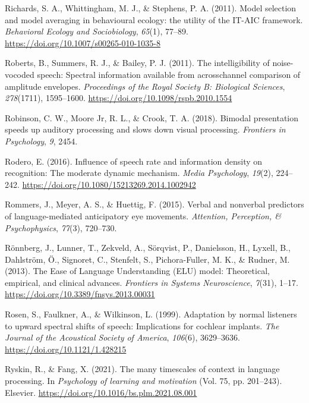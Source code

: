 \documentclass[a4paper, nobind]{templates/ociamthesis}
\newlength{\cslhangindent}
\newenvironment{CSLReferences}[2] %
 {%
  \setlength{\parindent}{0pt}
  \ifodd #1
  \let\oldpar\par
  \def\par{\hangindent=\cslhangindent\oldpar}
  \fi
  \setlength{\parskip}{1mm}
  \setlength{\baselineskip}{6mm}
 }%
 {}
\begin{document}
\begin{CSLReferences}{1}{0}
\leavevmode{}%
Richards, S. A., Whittingham, M. J., \& Stephens, P. A. (2011). Model selection and model averaging in behavioural ecology: the utility of the IT-AIC framework. \emph{Behavioral Ecology and Sociobiology}, \emph{65}(1), 77--89. \url{https://doi.org/10.1007/s00265-010-1035-8}

\leavevmode{}%
Roberts, B., Summers, R. J., \& Bailey, P. J. (2011). The intelligibility of noise-vocoded speech: Spectral information available from acrosschannel comparison of amplitude envelopes. \emph{Proceedings of the Royal Society B: Biological Sciences}, \emph{278}(1711), 1595--1600. \url{https://doi.org/10.1098/rspb.2010.1554}

\leavevmode{}%
Robinson, C. W., Moore Jr, R. L., \& Crook, T. A. (2018). Bimodal presentation speeds up auditory processing and slows down visual processing. \emph{Frontiers in Psychology}, \emph{9}, 2454.

\leavevmode{}%
Rodero, E. (2016). {Influence of speech rate and information density on recognition: The moderate dynamic mechanism}. \emph{Media Psychology}, \emph{19}(2), 224--242. \url{https://doi.org/10.1080/15213269.2014.1002942}

\leavevmode{}%
Rommers, J., Meyer, A. S., \& Huettig, F. (2015). Verbal and nonverbal predictors of language-mediated anticipatory eye movements. \emph{Attention, Perception, \& Psychophysics}, \emph{77}(3), 720--730.

\leavevmode{}%
Rönnberg, J., Lunner, T., Zekveld, A., Sörqvist, P., Danielsson, H., Lyxell, B., Dahlström, Ö., Signoret, C., Stenfelt, S., Pichora-Fuller, M. K., \& Rudner, M. (2013). {The Ease of Language Understanding (ELU) model: Theoretical, empirical, and clinical advances}. \emph{Frontiers in Systems Neuroscience}, \emph{7}(31), 1--17. \url{https://doi.org/10.3389/fnsys.2013.00031}

\leavevmode{}%
Rosen, S., Faulkner, A., \& Wilkinson, L. (1999). Adaptation by normal listeners to upward spectral shifts of speech: Implications for cochlear implants. \emph{The Journal of the Acoustical Society of America}, \emph{106}(6), 3629--3636. \url{https://doi.org/10.1121/1.428215}

\leavevmode{}%
Ryskin, R., \& Fang, X. (2021). The many timescales of context in language processing. In \emph{Psychology of learning and motivation} (Vol. 75, pp. 201--243). Elsevier. \url{https://doi.org/10.1016/bs.plm.2021.08.001}


\end{CSLReferences}
\end{document}

